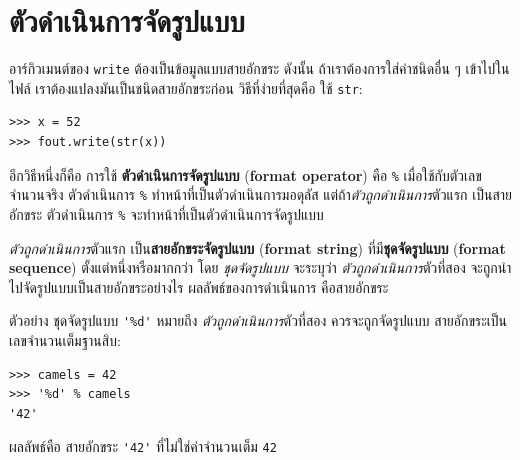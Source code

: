 \section{ตัวดำเนินการจัดรูปแบบ}
\label{file Format operator}



อาร์กิวเมนต์ของ \texttt{write} ต้องเป็นข้อมูลแบบสายอักขระ
ดังนั้น ถ้าเราต้องการใส่ค่าชนิดอื่น ๆ เข้าไปในไฟล์
เราต้องแปลงมันเป็นชนิดสายอักขระก่อน
วิธีที่ง่ายที่สุดคือ ใช้ \texttt{str}:

\begin{verbatim}
>>> x = 52
>>> fout.write(str(x))
\end{verbatim}
%
%
อีกวิธีหนึ่งก็คือ การใช้ \textbf{ตัวดำเนินการจัดรูปแบบ} (\textbf{format operator})
คือ \texttt{\%}
เมื่อใช้กับตัวเลขจำนวนจริง ตัวดำเนินการ \texttt{\%} ทำหน้าที่เป็นตัวดำเนินการมอดุลัส
แต่ถ้า\textit{ตัวถูกดำเนินการ}ตัวแรก เป็นสายอักขระ
ตัวดำเนินการ \texttt{\%} จะทำหน้าที่เป็นตัวดำเนินการจัดรูปแบบ


\textit{ตัวถูกดำเนินการ}ตัวแรก เป็น\textbf{สายอักขระจัดรูปแบบ} (\textbf{format string}) ที่มี\textbf{ชุดจัดรูปแบบ} (\textbf{format sequence}) ตั้งแต่หนึ่งหรือมากกว่า
โดย \textit{ชุดจัดรูปแบบ} จะระบุว่า \textit{ตัวถูกดำเนินการ}ตัวที่สอง จะถูกนำไปจัดรูปแบบเป็นสายอักขระอย่างไร
ผลลัพธ์ของการดำเนินการ คือสายอักขระ


ตัวอย่าง ชุดจัดรูปแบบ \verb|'%d'|
หมายถึง
\textit{ตัวถูกดำเนินการ}ตัวที่สอง ควรจะถูกจัดรูปแบบ 
สายอักขระเป็นเลขจำนวนเต็มฐานสิบ:

\begin{verbatim}
>>> camels = 42
>>> '%d' % camels
'42'
\end{verbatim}
%
%
ผลลัพธ์คือ สายอักขระ \verb|'42'| ที่ไม่ใช่ค่าจำนวนเต็ม \texttt{42}

